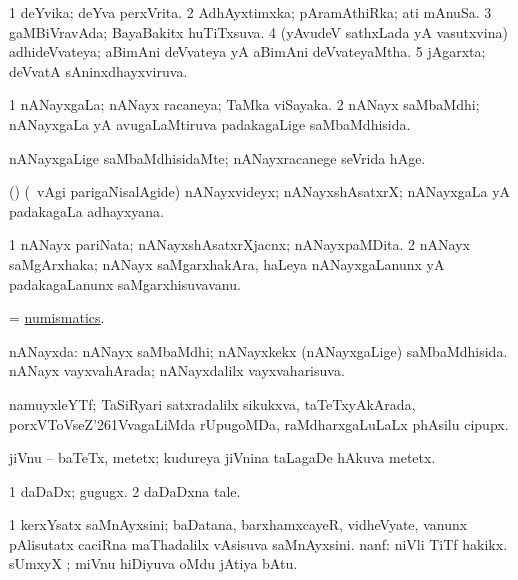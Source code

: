 \bentry
{}
\gl{\gu}
\bmng
\bnum
\num{1} deYvika; deYva perxVrita. 
\num{2} AdhAyxtimxka; pAramAthiRka; ati mAnuSa. 
\num{3} gaMBiVravAda; BayaBakitx huTiTxsuva. 
\num{4} (yAvudeV sathxLada yA vasutxvina) adhideVvateya; aBimAni deVvateya yA aBimAni deVvateyaMtha. 
\num{5} jAgarxta; deVvatA sAninxdhayxviruva. 
\enum
\emng
\eentry

\bentry
{}
\gl{\gu}
\bmng
\bnum
\num{1} nANayxgaLa; nANayx racaneya; TaMka viSayaka. 
\num{2} nANayx saMbaMdhi; nANayxgaLa yA avugaLaMtiruva padakagaLige saMbaMdhisida. 
\enum
\emng
\eentry

\bentry
{}
\gl{\kirxvi}
\bmng
nANayxgaLige saMbaMdhisidaMte; nANayxracanege seVrida hAge. 
\emng
\eentry

\bentry
{}
\gl{\nA}
\bmng
(\bava) (\sA\ \Eva vAgi parigaNisalAgide) nANayxvideyx; nANayxshAsatxrX; nANayxgaLa yA padakagaLa adhayxyana. 
\emng
\eentry

\bentry
{}
\gl{\nA}
\bmng
\bnum
\num{1} nANayx pariNata; nANayxshAsatxrXjacnx; nANayxpaMDita. 
\num{2} nANayx saMgArxhaka; nANayx saMgarxhakAra, haLeya nANayxgaLanunx yA padakagaLanunx saMgarxhisuvavanu. 
\enum
\emng
\eentry

\bentry
{}
\gl{\nA}
\bmng
= \hyperlink{numismatics}{numismatics}. 
\emng
\eentry

\bentry
{}
\gl{\gu}
\bmng
nANayxda: 
\banum
{} nANayx saMbaMdhi; nANayxkekx (nANayxgaLige) saMbaMdhisida. 
 nANayx vayxvahArada; nANayxdalilx vayxvaharisuva. 
\eanum
\emng
\eentry

\bentry
{}
\gl{\nA}
\bmng
namuyxleYTf; TaSiRyari satxradalilx sikukxva, taTeTxyAkArada, porxVToVseZ\char'261VvagaLiMda rUpugoMDa, raMdharxgaLuLaLx phAsilu cipupx. 
\emng
\eentry

\bentry
{}
\gl{\nA}
\bmng
jiVnu -- baTeTx, metetx; kudureya jiVnina taLagaDe hAkuva metetx. 
\emng
\eentry

\bentry
{}
\gl{\nA}
\bmng
\bnum
\num{1} daDaDx; gugugx. 
\num{2} daDaDxna tale. 
\enum
\emng
\eentry

\bentry
{}
\gl{\nA}
\bmng
\bnum
\num{1} kerxYsatx saMnAyxsini; baDatana, barxhamxcayeR, vidheVyate, \mo vanunx pAlisutatx caciRna maThadalilx vAsisuva saMnAyxsini. 
 nanf: 
\banum
{} niVli TiTf hakikx. 
 sUmxyX ; miVnu hiDiyuva oMdu jAtiya bAtu. 
\eanum
\numie
\enum
\emng

